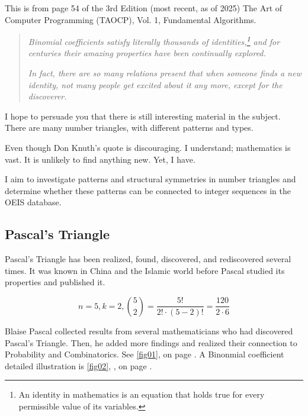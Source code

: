 \documentclass[12pt]{article}
\begin{document}
    This is from page 54 of the 3rd Edition (most recent, as of 2025) The Art of Computer 
    Programming (TAOCP), Vol. 1, Fundamental Algorithms.\cite{Knuth.1997}
    
    \begin{quote}
    \textit{Binomial coefficients satisfy literally thousands of identities,\footnote{An identity 
    in mathematics is an equation that holds true for every permissible value of its variables.} 
    and for centuries their amazing properties have been continually explored.}
    
    \textit{In fact, there are so many relations present that when someone finds a new identity, 
    not many people get excited about it any more, except for the discoverer.}
    \end{quote}
    
    I hope to persuade you that there is still interesting material in the subject. There are 
    many number triangles, with different patterns and types.
    
    Even though Don Knuth's quote is discouraging. I understand; mathematics is vast. It is 
    unlikely to find anything new. Yet, I have.
    
    I aim to investigate patterns and structural symmetries in number triangles and determine 
    whether these patterns can be connected to integer sequences in the OEIS database.
 
     
    \subsection{Pascal's Triangle}
    \label{sec:13}

    Pascal's Triangle has been realized, found, discovered, and rediscovered several times. It 
    was known in China and the Islamic world before Pascal studied its properties and published 
    it.
    
    \begin{equation}
        \label{eq:e2}
        n = 5,k = 2,\binom{5}{2} = \frac{{5!}}{{2!\cdot (5 - 2)!}} = \frac{{120}}{{2 \cdot 6}}
    \end{equation}
    
    Blaise Pascal collected results from several mathematicians who had discovered Pascal's 
    Triangle. Then, he added more findings and realized their connection to Probability and 
    Combinatorics. See \cref{fig01},  on page \pageref{fig01}.
    A Binonmial coefficient detailed illustration is \cref{fig02}, , on page 
    \pageref{fig02}.
    
\end{document}
